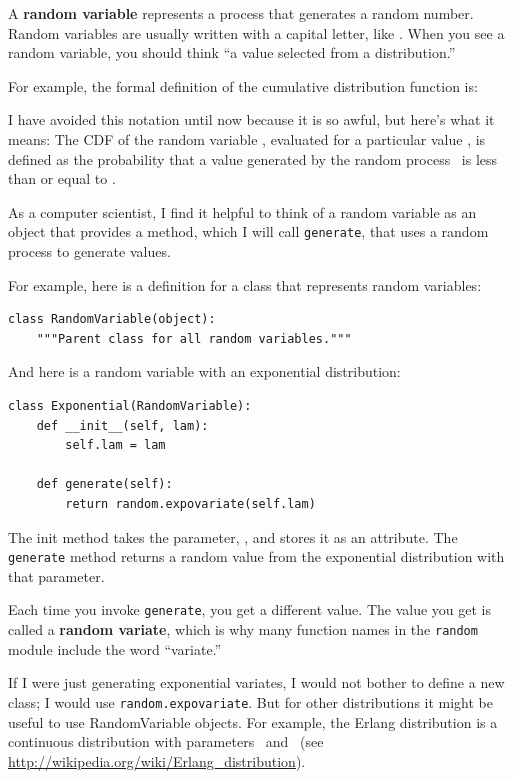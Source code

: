 \documentclass[12pt]{book}
\begin{document}
A {\bf random variable} represents a process that generates a random
number.  Random variables are usually written with a capital letter,
like \X.  When you see a random variable, you should think ``a value
selected from a distribution.''

For example, the formal definition of the cumulative distribution
function is:


I have avoided this notation until now because it is so awful, but
here's what it means: The CDF of the random variable \X, evaluated
for a particular value \x, is defined as the probability that
a value generated by the random process \X~is less than or equal
to \x.

As a computer scientist, I find it helpful to think of a random
variable as an object that provides a method, which I will call
{\tt generate}, that uses a random process to generate values.

For example, here is a definition for a class that represents
random variables:
%
\begin{verbatim}
class RandomVariable(object):
    """Parent class for all random variables."""
\end{verbatim}

And here is a random variable with an exponential distribution:
%
\begin{verbatim}
class Exponential(RandomVariable):
    def __init__(self, lam):
        self.lam = lam

    def generate(self):
        return random.expovariate(self.lam)
\end{verbatim}

The init method takes the parameter, \mylambda, and stores it as
an attribute.  The {\tt generate} method returns a random value
from the exponential distribution with that parameter.

Each time you invoke {\tt generate}, you get a different value.  The
value you get is called a {\bf random variate}, which is why many
function names in the {\tt random} module include the word ``variate.''

If I were just generating exponential variates, I would not bother to
define a new class; I would use {\tt random.expovariate}.  But for
other distributions it might be useful to use RandomVariable objects.
For example, the Erlang distribution is a continuous distribution with
parameters \mylambda~and \kk~(see
\url{http://wikipedia.org/wiki/Erlang_distribution}).
\end{document}
